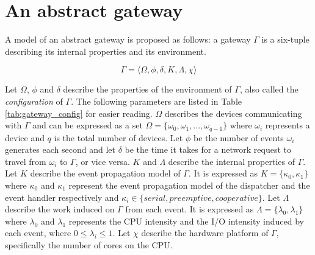 \section{An abstract gateway}

A model of an abstract gateway is proposed as follows: a gateway $\Gamma$ is a
six-tuple describing its internal properties and its environment.

\begin{equation}
\Gamma = \big \langle \Omega, \phi, \delta, K, \Lambda, \chi \big \rangle
\end{equation}

Let $\Omega$, $\phi$ and $\delta$ describe the properties of the environment of
$\Gamma$, also called the \textit{configuration} of $\Gamma$. The following
parameters are listed in Table \ref{tab:gateway_config} for easier reading.
$\Omega$ describes the devices communicating with $\Gamma$ and can be expressed
as a set $\Omega = \{ \omega_0, \omega_1, ..., \omega_{q-1} \}$ where
$\omega_i$ represents a device and $q$ is the total number of devices. Let
$\phi$ be the number of events $\omega_i$ generates each second and let
$\delta$ be the time it takes for a network request to travel from $\omega_i$
to $\Gamma$, or vice versa. $K$ and $\Lambda$ describe the internal properties
of $\Gamma$. Let $K$ describe the event propagation model of $\Gamma$. It is
expressed as $K = \{ \kappa_0, \kappa_1 \}$ where $\kappa_0$ and $\kappa_1$
represent the event propagation model of the dispatcher and the event handler
respectively and $\kappa_i \in \{ \textit{serial}, \textit{preemptive},
\textit{cooperative} \}$. Let $\Lambda$ describe the work induced on $\Gamma$
from each event. It is expressed as $\Lambda = \{ \lambda_0, \lambda_1 \}$
where $\lambda_0$ and $\lambda_1$ represents the CPU intensity and the I/O
intensity induced by each event, where $0 \leq \lambda_i \leq 1$. Let $\chi$
describe the hardware platform of $\Gamma$, specifically the number of cores on
the CPU.

